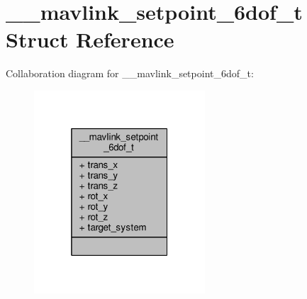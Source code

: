 \hypertarget{struct____mavlink__setpoint__6dof__t}{\section{\+\_\+\+\_\+mavlink\+\_\+setpoint\+\_\+6dof\+\_\+t Struct Reference}
\label{struct____mavlink__setpoint__6dof__t}
}


Collaboration diagram for \+\_\+\+\_\+mavlink\+\_\+setpoint\+\_\+6dof\+\_\+t\+:
\nopagebreak
\begin{figure}[H]
\begin{center}
\leavevmode
\includegraphics[width=181pt]{struct____mavlink__setpoint__6dof__t__coll__graph}
\end{center}
\end{figure}
